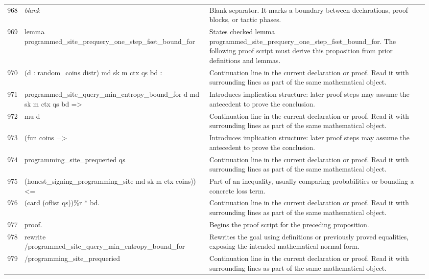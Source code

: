 \documentclass[10pt]{article}
\begin{document}
\begin{longtable}{r L{0.53\textwidth} L{0.37\textwidth}}
968 & {\ttfamily\scriptsize \emph{blank}} & Blank separator.  It marks a boundary between declarations, proof blocks, or tactic phases. \\
969 & {\ttfamily\scriptsize lemma programmed\_site\_prequery\_one\_step\_fset\_bound\_for} & States checked lemma programmed\_site\_prequery\_one\_step\_fset\_bound\_for.  The following proof script must derive this proposition from prior definitions and lemmas. \\
970 & {\ttfamily\scriptsize   (d : random\_coins distr) md sk m ctx qs bd :} & Continuation line in the current declaration or proof.  Read it with surrounding lines as part of the same mathematical object. \\
971 & {\ttfamily\scriptsize   programmed\_site\_query\_min\_entropy\_bound\_for d md sk m ctx qs bd =>} & Introduces implication structure: later proof steps may assume the antecedent to prove the conclusion. \\
972 & {\ttfamily\scriptsize   mu d} & Continuation line in the current declaration or proof.  Read it with surrounding lines as part of the same mathematical object. \\
973 & {\ttfamily\scriptsize     (fun coins =>} & Introduces implication structure: later proof steps may assume the antecedent to prove the conclusion. \\
974 & {\ttfamily\scriptsize       programming\_site\_prequeried qs} & Continuation line in the current declaration or proof.  Read it with surrounding lines as part of the same mathematical object. \\
975 & {\ttfamily\scriptsize         (honest\_signing\_programming\_site md sk m ctx coins)) <=} & Part of an inequality, usually comparing probabilities or bounding a concrete loss term. \\
976 & {\ttfamily\scriptsize   (card (oflist qs))\%r * bd.} & Continuation line in the current declaration or proof.  Read it with surrounding lines as part of the same mathematical object. \\
977 & {\ttfamily\scriptsize proof.} & Begins the proof script for the preceding proposition. \\
978 & {\ttfamily\scriptsize rewrite /programmed\_site\_query\_min\_entropy\_bound\_for} & Rewrites the goal using definitions or previously proved equalities, exposing the intended mathematical normal form. \\
979 & {\ttfamily\scriptsize         /programming\_site\_prequeried} & Continuation line in the current declaration or proof.  Read it with surrounding lines as part of the same mathematical object. \\

\end{longtable}
\end{document}
